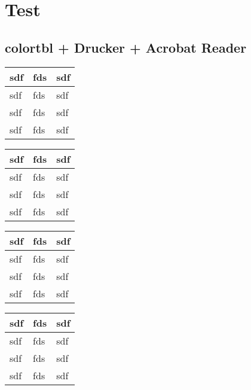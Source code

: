 
\chapter{Test}
\clearpage
\section{colortbl + Drucker + Acrobat Reader}

\begin{table}[H]
  \begin{tabularx}{0.8\textwidth}{|XXX|}
    \hline
    sdf & fds & sdf \\
    \hline
    sdf & fds & sdf \\
    sdf & fds & sdf \\
    sdf & fds & sdf \\
    \hline
  \end{tabularx}
\end{table}

\begin{table}[H]
  \oddrowcolors
  \begin{tabularx}{0.8\textwidth}{|XXX|}
    \hline
    sdf & fds & sdf \\
    \hline
    sdf & fds & sdf \\
    sdf & fds & sdf \\
    sdf & fds & sdf \\
    \hline
  \end{tabularx}
\end{table}

\begin{table}[H]
  \oddrowcolors
  \begin{tabularx}{0.8\textwidth}{|XXX|}
    \hline
    sdf & fds & sdf \\
    \hline
    sdf & fds & sdf \\
    sdf & fds & sdf \\
    sdf & fds & sdf \\
    \hline
  \end{tabularx}
\end{table}

\begin{table}[H]
  \def\eltransparency{0.2}
  \begin{tabularx}{0.8\textwidth}{|XXX|}
    \hline
    sdf & fds & sdf \\
    \hline
    sdf & fds & sdf \\
    sdf & fds & sdf \\
    sdf & fds & sdf \\
    \hline
  \end{tabularx}
\end{table}

